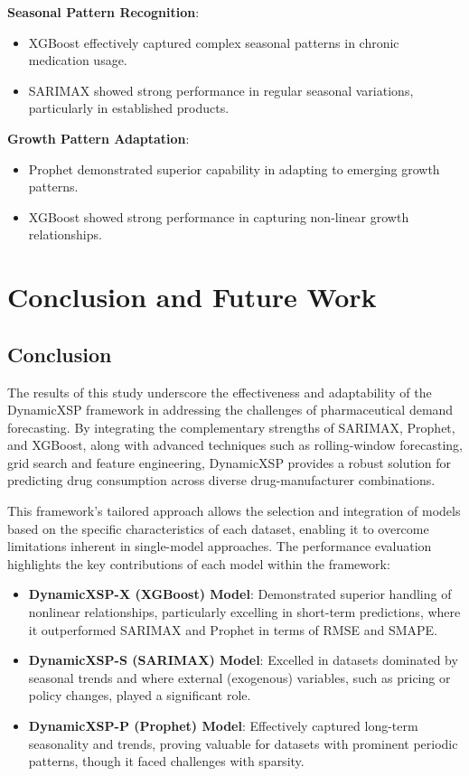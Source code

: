\documentclass[journal]{IEEEtran}
\begin{document}
\textbf{Seasonal Pattern Recognition}:
\begin{itemize}
\item XGBoost effectively captured complex seasonal patterns in chronic medication usage.
\item SARIMAX showed strong performance in regular seasonal variations, particularly in established products.
\end{itemize}

\textbf{Growth Pattern Adaptation}:
\begin{itemize}
\item Prophet demonstrated superior capability in adapting to emerging growth patterns.
\item XGBoost showed strong performance in capturing non-linear growth relationships.
\end{itemize}


\section{Conclusion and Future Work}

\subsection{Conclusion}

The results of this study underscore the effectiveness and adaptability of the DynamicXSP framework in addressing the challenges of pharmaceutical demand forecasting. By integrating the complementary strengths of SARIMAX, Prophet, and XGBoost, along with advanced techniques such as rolling-window forecasting, grid search and feature engineering, DynamicXSP provides a robust solution for predicting drug consumption across diverse drug-manufacturer combinations.

This framework's tailored approach allows the selection and integration of models based on the specific characteristics of each dataset, enabling it to overcome limitations inherent in single-model approaches. The performance evaluation highlights the key contributions of each model within the framework: 

\begin{itemize} 
    \item \textbf{DynamicXSP-X (XGBoost) Model}: Demonstrated superior handling of nonlinear relationships, particularly excelling in short-term predictions, where it outperformed SARIMAX and Prophet in terms of RMSE and SMAPE. 
    \item \textbf{DynamicXSP-S (SARIMAX) Model}: Excelled in datasets dominated by seasonal trends and where external (exogenous) variables, such as pricing or policy changes, played a significant role. 
    \item \textbf{DynamicXSP-P (Prophet) Model}: Effectively captured long-term seasonality and trends, proving valuable for datasets with prominent periodic patterns, though it faced challenges with sparsity. \end{itemize}
\end{document}

